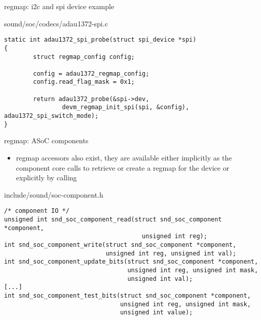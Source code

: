 \begin{frame}[fragile]{regmap: i2c and spi device example}
  \begin{block}{sound/soc/codecs/adau1372-spi.c}
  \fontsize{8}{8}\selectfont
    \begin{verbatim}
static int adau1372_spi_probe(struct spi_device *spi)
{
        struct regmap_config config;

        config = adau1372_regmap_config;
        config.read_flag_mask = 0x1;

        return adau1372_probe(&spi->dev,
                devm_regmap_init_spi(spi, &config), adau1372_spi_switch_mode);
}
    \end{verbatim}
  \end{block}
\end{frame}

\begin{frame}[fragile]{regmap: ASoC components}
  \begin{itemize}
  \item {} regmap accessors also exist, they are
    available either implicitly as the component core calls
     to retrieve or create
    a regmap for the device or explicitly by calling
  \end{itemize}
  \begin{block}{include/sound/soc-component.h}
  \fontsize{9}{9}\selectfont
    \begin{verbatim}
/* component IO */
unsigned int snd_soc_component_read(struct snd_soc_component *component,
                                      unsigned int reg);
int snd_soc_component_write(struct snd_soc_component *component,
                            unsigned int reg, unsigned int val);
int snd_soc_component_update_bits(struct snd_soc_component *component,
                                  unsigned int reg, unsigned int mask,
                                  unsigned int val);
[...]
int snd_soc_component_test_bits(struct snd_soc_component *component,
                                unsigned int reg, unsigned int mask,
                                unsigned int value);
    \end{verbatim}
  \end{block}
\end{frame}
